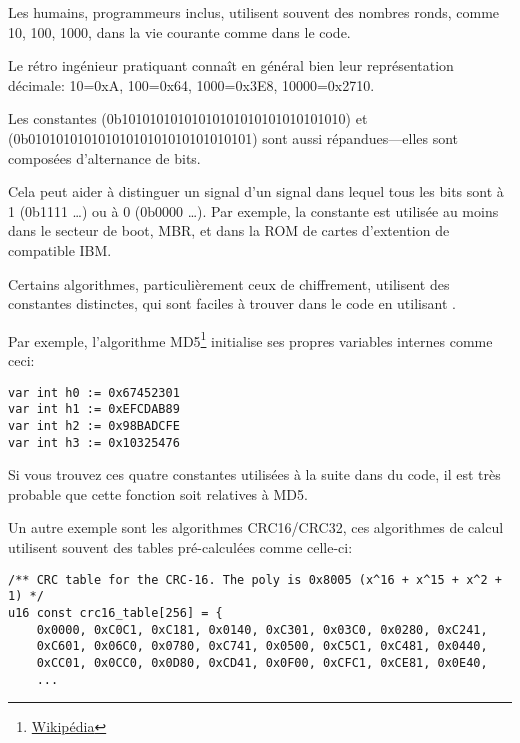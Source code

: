 ﻿

Les humains, programmeurs inclus, utilisent souvent des nombres ronds, comme 10, 100,
1000, dans la vie courante comme dans le code.

Le rétro ingénieur pratiquant connaît en général bien leur représentation décimale:
10=0xA, 100=0x64, 1000=0x3E8, 10000=0x2710.

Les constantes  (0b10101010101010101010101010101010) et \\
 (0b01010101010101010101010101010101)  sont aussi répandues---elles
sont composées d'alternance de bits.

Cela peut aider à distinguer un signal d'un signal dans lequel tous les bits sont
à 1 (0b1111 \dots) ou à 0 (0b0000 \dots).
Par exemple, la constante  est utilisée au moins dans le secteur de boot,
\ac{MBR}, et dans la \ac{ROM} de cartes d'extention de compatible IBM.

Certains algorithmes, particulièrement ceux de chiffrement, utilisent des constantes
distinctes, qui sont faciles à trouver dans le code en utilisant \IDA.

\newcommand{\URLMD}{http://go.yurichev.com/17111}

Par exemple, l'algorithme MD5\footnote{\href{\URLMD}{Wikipédia}} initialise ses propres
variables internes comme ceci:

\begin{verbatim}
var int h0 := 0x67452301
var int h1 := 0xEFCDAB89
var int h2 := 0x98BADCFE
var int h3 := 0x10325476
\end{verbatim}

Si vous trouvez ces quatre constantes utilisées à la suite dans du code, il est
très probable que cette fonction soit relatives à MD5.

\par Un autre exemple sont les algorithmes CRC16/CRC32, ces algorithmes de calcul
utilisent souvent des tables pré-calculées comme celle-ci:

\begin{lstlisting}[caption=linux/lib/crc16.c,style=customc]
/** CRC table for the CRC-16. The poly is 0x8005 (x^16 + x^15 + x^2 + 1) */
u16 const crc16_table[256] = {
	0x0000, 0xC0C1, 0xC181, 0x0140, 0xC301, 0x03C0, 0x0280, 0xC241,
	0xC601, 0x06C0, 0x0780, 0xC741, 0x0500, 0xC5C1, 0xC481, 0x0440,
	0xCC01, 0x0CC0, 0x0D80, 0xCD41, 0x0F00, 0xCFC1, 0xCE81, 0x0E40,
	...
\end{lstlisting}

